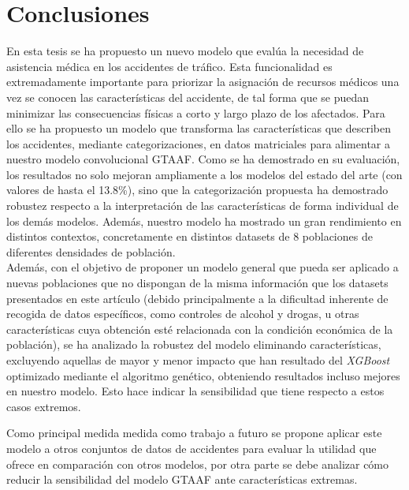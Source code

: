 
\chapter{Conclusiones}


En esta tesis se ha propuesto un nuevo modelo que evalúa la necesidad de asistencia médica en los accidentes de tráfico. Esta funcionalidad es extremadamente importante para priorizar la asignación de recursos médicos una vez se conocen las características del accidente, de tal forma que se puedan minimizar las consecuencias físicas a corto y largo plazo de los afectados. Para ello se ha propuesto un modelo que transforma las características que describen los accidentes, mediante categorizaciones, en datos matriciales para alimentar a nuestro modelo convolucional GTAAF. Como se ha demostrado en su evaluación, los resultados no solo mejoran ampliamente a los modelos del estado del arte (con valores de hasta el 13.8\%), sino que la categorización propuesta ha demostrado robustez respecto a la interpretación de las características de forma individual de los demás modelos. Además, nuestro modelo ha mostrado un gran rendimiento en distintos contextos, concretamente en  distintos datasets de 8 poblaciones de diferentes densidades de población.\\

Además, con el objetivo de proponer un modelo general que pueda ser aplicado a nuevas poblaciones que no dispongan de la misma información que los datasets presentados en este artículo (debido principalmente a la dificultad inherente de recogida de datos específicos, como controles de alcohol y drogas, u otras características cuya obtención esté relacionada con la condición económica de la población), se ha analizado la robustez del modelo eliminando características, excluyendo aquellas de mayor y menor impacto que han resultado del \textit{XGBoost} optimizado mediante el algoritmo genético, obteniendo resultados incluso mejores en nuestro modelo. Esto hace indicar la sensibilidad que tiene respecto a estos casos extremos.

Como principal medida medida como trabajo a futuro se propone aplicar este modelo a otros conjuntos de datos de accidentes para evaluar la utilidad que ofrece en comparación con otros modelos, por otra parte se debe analizar cómo reducir la sensibilidad del modelo GTAAF ante características extremas.


